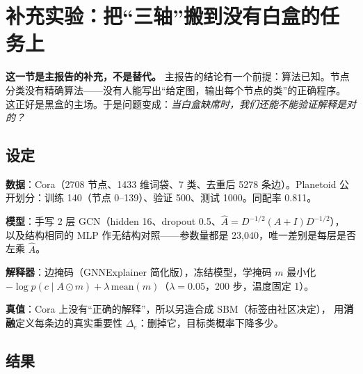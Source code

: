 \section{补充实验：把“三轴”搬到没有白盒的任务上}\label{sec:appB}

\noindent\textbf{这一节是主报告的补充，不是替代。}
主报告的结论有一个前提：算法已知。节点分类没有精确算法——没有人能写出“给定图，输出每个节点的类”的正确程序。
这正好是黑盒的主场。于是问题变成：\emph{当白盒缺席时，我们还能不能验证解释是对的？}

\subsection{设定}

\textbf{数据}：Cora（2708 节点、1433 维词袋、7 类、去重后 5278 条边）。Planetoid 公开划分：训练 140（节点 0--139）、验证 500、测试 1000。同配率 0.811。

\textbf{模型}：手写 2 层 GCN（hidden 16、dropout 0.5、$\hat A=D^{-1/2}(A+I)D^{-1/2}$），
以及结构相同的 MLP 作无结构对照——参数量都是 23{,}040，唯一差别是每层是否左乘 $\hat A$。

\textbf{解释器}：边掩码（GNNExplainer 简化版），冻结模型，学掩码 $m$ 最小化
$-\log p(c\mid A\odot m)+\lambda\,\mathrm{mean}(m)$（$\lambda=0.05$，200 步，温度固定 1）。

\textbf{真值}：Cora 上没有“正确的解释”，所以另造合成 SBM（标签由社区决定），
用\textbf{消融}定义每条边的真实重要性 $\Delta_e$：删掉它，目标类概率下降多少。

\subsection{结果}

